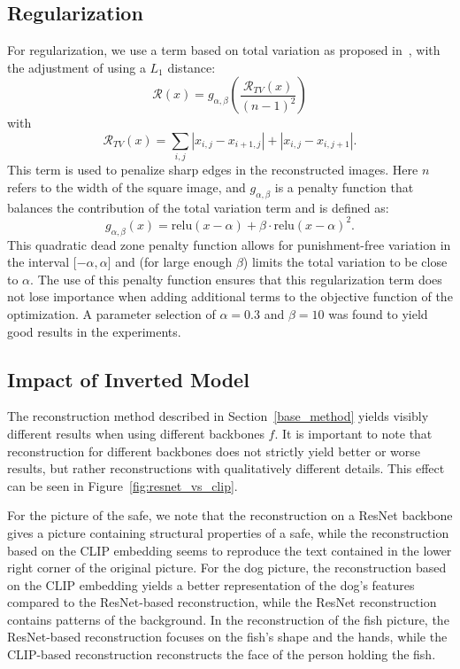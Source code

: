 \documentclass[10pt,twocolumn]{article}
\begin{document}
\subsection{Regularization}\label{reg}
For regularization, we use a term based on total variation as proposed in~\cite{mahendranUnderstandingDeepImage2015}, with the adjustment of using a $L_1$ distance:
$$
\mathcal{R}(x) = g_{\alpha,\beta}\left(\dfrac{\mathcal{R}_{TV}(x)}{(n-1)^2}\right)
$$
with
$$
\mathcal{R}_{TV}(x) = \sum_{i,j} \left| x_{i,j} - x_{i + 1,j} \right| + \left| x_{i,j} - x_{i,j + 1} \right|.
$$
This term is used to penalize sharp edges in the reconstructed images.
Here $n$ refers to the width of the square image, and $g_{\alpha,\beta}$ is a penalty function that balances the contribution of the total variation term and is defined as:
$$
g_{\alpha,\beta}(x) = \text{relu}(x - \alpha) + \beta\cdot\text{relu}(x - \alpha) ^ 2.
$$
This quadratic dead zone penalty function allows for punishment-free variation in the interval $\lbrack-\alpha,\alpha\rbrack$ and (for large enough $\beta$) limits the total variation to be close to $\alpha$.
The use of this penalty function ensures that this regularization term does not lose importance when adding additional terms to the objective function of the optimization.
A parameter selection of $\alpha = 0.3$ and $\beta = 10$ was found to yield good results in the experiments.

\subsection{Impact of Inverted Model}
The reconstruction method described in Section~\ref{base_method} yields visibly different results when using different backbones $f$.
It is important to note that reconstruction for different backbones does not strictly yield better or worse results, but rather reconstructions with qualitatively different details.
This effect can be seen in Figure~\ref{fig:resnet_vs_clip}.

For the picture of the safe, we note that the reconstruction on a ResNet backbone gives a picture containing structural properties of a safe, while the reconstruction based on the CLIP embedding seems to reproduce the text contained in the lower right corner of the original picture.
For the dog picture, the reconstruction based on the CLIP embedding yields a better representation of the dog's features compared to the ResNet-based reconstruction, while the ResNet reconstruction contains patterns of the background.
In the reconstruction of the fish picture, the ResNet-based reconstruction focuses on the fish's shape and the hands, while the CLIP-based reconstruction reconstructs the face of the person holding the fish.
\end{document}
